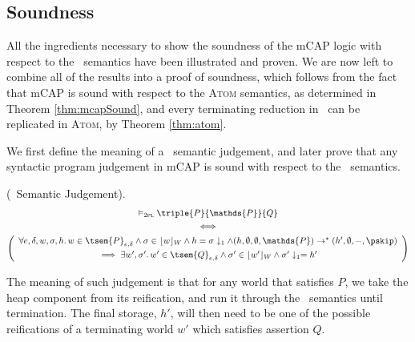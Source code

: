 







\subsection{Soundness}

All the ingredients necessary to show the soundness of the mCAP logic with respect to the \tpl\ semantics have been illustrated and proven. We are now left to combine all of the results into a proof of soundness, which follows from the fact that mCAP is sound with respect to the \textsc{Atom} semantics, as determined in Theorem \ref{thm:mcapSound}, and every terminating reduction in \tpl\ can be replicated in \textsc{Atom}, by Theorem \ref{thm:atom}.

We first define the meaning of a \tpl\ semantic judgement, and later prove that any syntactic program judgement in mCAP is sound with respect to the \tpl\ semantics.
\begin{defn}
	(\tpl\ Semantic Judgement).
	\begin{gather*}
		\vDash_\textsc{2pl} \triple{P}{\mathds{P}}{Q} \\
		\iff \\
		\left(
		\begin{array}{c}
			\forall e, \delta, w, \sigma, h \ldotp
			w \in \tsem{P}_{e, \delta} \land \sigma \in \lfloor w \rfloor_W \land h = \sigma \downarrow_1 \land (h, \emptyset, \emptyset, \mathds{P}) \rightarrow^* (h', \emptyset, -, \pskip) \\[0.4em]
			\implies \exists w', \sigma' \ldotp w' \in \tsem{Q}_{e, \delta} \land \sigma' \in \lfloor w' \rfloor_W \land \sigma' \downarrow_1 = h'
		\end{array}
		\right)
	\end{gather*}
\end{defn}

The meaning of such judgement is that for any world that satisfies $P$, we take the heap component from its reification, and run it through the \tpl\ semantics until termination. The final storage, $h'$, will then need to be one of the possible reifications of a terminating world $w'$ which satisfies assertion $Q$.

